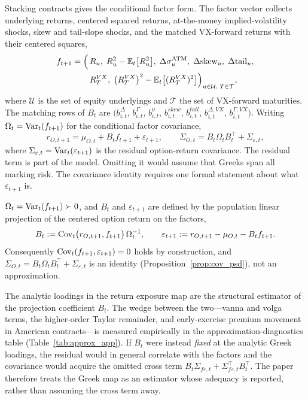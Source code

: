 Stacking contracts gives the conditional factor form. The factor vector collects underlying
returns, centered squared returns, at-the-money implied-volatility shocks, skew and
tail-slope shocks, and the matched VX-forward returns with their centered squares,
\[
\begin{aligned}
  f_{t+1}
  =\Bigl(\,&R_{u},\;
  R_{u}^{2}-\mathbb{E}_t\bigl[R_{u}^{2}\bigr],\;
  \Delta\sigma^{\mathrm{ATM}}_{u},\;
  \Delta\mathrm{skew}_{u},\;
  \Delta\mathrm{tail}_{u},\\
  &R^{VX}_{T},\;
  \bigl(R^{VX}_{T}\bigr)^{2}-\mathbb{E}_t\bigl[(R^{VX}_{T})^{2}\bigr]
  \Bigr)_{u\in\mathcal U,\;T\in\mathcal T},
\end{aligned}
\]
where \(\mathcal U\) is the set of equity underlyings and \(\mathcal T\) the set of
VX-forward maturities. The matching rows of \(B_t\) are
\(\bigl(b^\Delta_{i,t},\,b^\Gamma_{i,t},\,b^\nu_{i,t},\,b^{skew}_{i,t},\,b^{tail}_{i,t},\,
b^{\Delta,VX}_{i,t},\,b^{\Gamma,VX}_{i,t}\bigr)\). Writing
\(\Omega_t=\operatorname{Var}_t(f_{t+1})\) for the conditional factor covariance,
\[
  r_{O,t+1}=\mu_{O,t}+B_t f_{t+1}+\varepsilon_{t+1},
  \qquad
  \Sigma_{O,t}=B_t\Omega_tB_t^\top+\Sigma_{\varepsilon,t},
\]
where \(\Sigma_{\varepsilon,t}=\operatorname{Var}_t(\varepsilon_{t+1})\) is the residual option-return
covariance. The residual term is part of the model. Omitting it would assume that Greeks
span all marking risk. The covariance identity requires one formal statement about what
\(\varepsilon_{t+1}\) is.

\begin{assumption}\label{assump:projection}
\(\Omega_t=\operatorname{Var}_t(f_{t+1})\succ0\), and \(B_t\) and \(\varepsilon_{t+1}\) are defined by
the population linear projection of the centered option return on the factors,
\[
  B_t:=\operatorname{Cov}_t\bigl(r_{O,t+1},f_{t+1}\bigr)\,\Omega_t^{-1},
  \qquad
  \varepsilon_{t+1}:=r_{O,t+1}-\mu_{O,t}-B_t f_{t+1}.
\]
Consequently \(\operatorname{Cov}_t(f_{t+1},\varepsilon_{t+1})=0\) holds by construction, and
\(\Sigma_{O,t}=B_t\Omega_tB_t^\top+\Sigma_{\varepsilon,t}\) is an identity
(Proposition~\ref{prop:cov_psd}), not an approximation.
\end{assumption}

\begin{remark}\label{rem:greekmap}
The analytic loadings in the return exposure map are the structural estimator of the
projection coefficient \(B_t\). The wedge between the two---vanna and volga terms, the
higher-order Taylor remainder, and early-exercise premium movement in American
contracts---is measured empirically in the approximation-diagnostics table
(Table~\ref{tab:approx_app}). If \(B_t\) were instead \emph{fixed} at the analytic Greek
loadings, the residual would in general correlate with the factors and the covariance
would acquire the omitted cross term
\(B_t\Sigma_{f\varepsilon,t}+\Sigma_{f\varepsilon,t}^\top B_t^\top\). The paper therefore
treats the Greek map as an estimator whose adequacy is reported, rather than assuming the
cross term away.
\end{remark}

